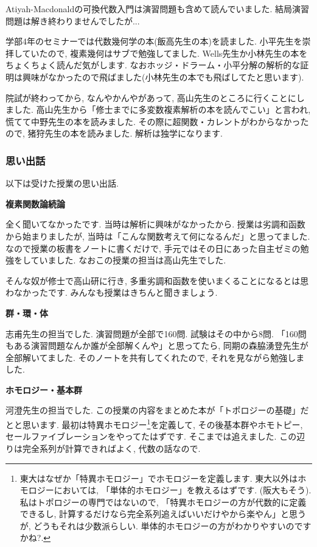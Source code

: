 Atiyah-Macdonaldの可換代数入門は演習問題も含めて読んでいました. 結局演習問題は解き終わりませんでしたが...

学部4年のセミナーでは代数幾何学の本(飯高先生の本)を読ました. 小平先生を崇拝していたので, 複素幾何はサブで勉強してました.  Wells先生か小林先生の本をちょくちょく読んだ気がします. なおホッジ・ドラーム・小平分解の解析的な証明は興味がなかったので飛ばました(小林先生の本でも飛ばしてたと思います).

院試が終わってから, なんやかんやがあって, 高山先生のところに行くことにしました. 高山先生から「修士までに多変数複素解析の本を読んでこい」と言われ, 慌てて中野先生の本を読みました. 
その際に超関数・カレントがわからなかったので, 猪狩先生の本を読みました. 解析は独学になります.  

\subsubsection{思い出話} 
以下は受けた授業の思い出話. 

\textbf{複素関数論続論 }  　\vspace{-6pt} 

全く聞いてなかったです. 当時は解析に興味がなかったから.
授業は劣調和函数から始まりましたが, 当時は「こんな関数考えて何になるんだ」と思ってました.
なので授業の板書をノートに書くだけで, 手元ではその日にあった自主ゼミの勉強をしていました. 
なおこの授業の担当は高山先生でした.  

そんな奴が修士で高山研に行き, 多重劣調和函数を使いまくることになるとは思わなかったです. みんなも授業はきちんと聞きましょう.
\vspace{8pt}  

\textbf{群・環・体}  　\vspace{-6pt} 

志甫先生の担当でした. 演習問題が全部で160問. 試験はその中から8問. 
「160問もある演習問題なんか誰が全部解くんや」と思ってたら, 同期の森脇湧登先生が全部解いてました. そのノートを共有してくれたので, それを見ながら勉強しました. 
\vspace{8pt} 

\textbf{ホモロジー・基本群 }  　\vspace{-6pt} 

河澄先生の担当でした. この授業の内容をまとめた本が「トポロジーの基礎」だとと思います. 
最初は特異ホモロジー\footnote{東大はなぜか「特異ホモロジー」でホモロジーを定義します. 東大以外はホモロジーにおいては, 「単体的ホモロジー」を教えるはずです. (阪大もそう). 私はトポロジーの専門ではないので, 「特異ホモロジーの方が代数的に定義できるし, 計算するだけなら完全系列追えばいいだけやから楽やん」と思うが, どうもそれは少数派らしい. 単体的ホモロジーの方がわかりやすいのですかね?. }を定義して, その後基本群やホモトピー, セールファイブレーションをやってたはずです. そこまでは追えました. この辺りは完全系列が計算できればよく, 代数の話なので. 

